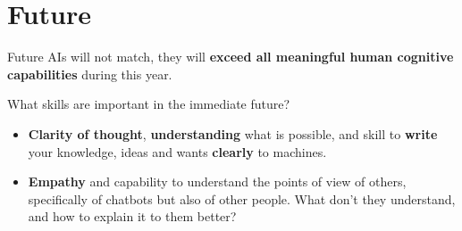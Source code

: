 \documentclass{beamer}
\begin{document}
\section{Future}
\begin{frame}{Future}
AIs will not match, they will \textbf{exceed all meaningful human cognitive capabilities} during this year.

What skills are important in the immediate future?
  \begin{itemize}
    \item \textbf{Clarity of thought}, \textbf{understanding} what is possible, and skill to \textbf{write} your knowledge, ideas and wants \textbf{clearly} to machines.
    \item \textbf{Empathy} and capability to understand the points of view of others, specifically of chatbots but also of other people. What don't they understand, and how to explain it to them better?
  \end{itemize}
\end{frame}
\end{document}
